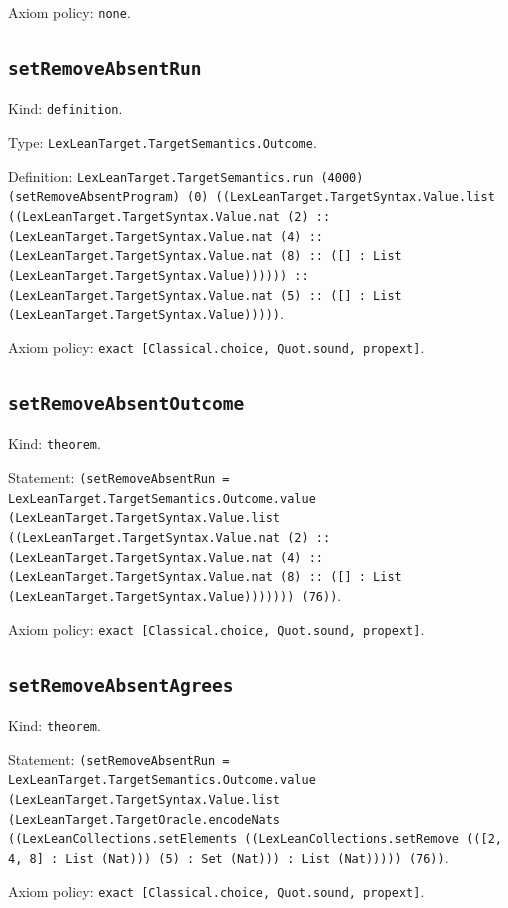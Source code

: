 \documentclass[11pt]{article}
\begin{document}
\noindent Axiom policy: \texttt{none}.\par
\subsection*{\texttt{setRemoveAbsentRun}}
\noindent Kind: \texttt{definition}.\par
\noindent Type: \texttt{LexLeanTarget.TargetSemantics.Outcome}.\par
\noindent Definition: \texttt{LexLeanTarget.TargetSemantics.run (4000) (setRemoveAbsentProgram) (0) ((LexLeanTarget.TargetSyntax.Value.list ((LexLeanTarget.TargetSyntax.Value.nat (2) :: (LexLeanTarget.TargetSyntax.Value.nat (4) :: (LexLeanTarget.TargetSyntax.Value.nat (8) :: ([] : List (LexLeanTarget.TargetSyntax.Value)))))) :: (LexLeanTarget.TargetSyntax.Value.nat (5) :: ([] : List (LexLeanTarget.TargetSyntax.Value)))))}.\par
\noindent Axiom policy: \texttt{exact [Classical.choice, Quot.sound, propext]}.\par
\subsection*{\texttt{setRemoveAbsentOutcome}}
\noindent Kind: \texttt{theorem}.\par
\noindent Statement: \texttt{(setRemoveAbsentRun = LexLeanTarget.TargetSemantics.Outcome.value (LexLeanTarget.TargetSyntax.Value.list ((LexLeanTarget.TargetSyntax.Value.nat (2) :: (LexLeanTarget.TargetSyntax.Value.nat (4) :: (LexLeanTarget.TargetSyntax.Value.nat (8) :: ([] : List (LexLeanTarget.TargetSyntax.Value))))))) (76))}.\par
\noindent Axiom policy: \texttt{exact [Classical.choice, Quot.sound, propext]}.\par
\subsection*{\texttt{setRemoveAbsentAgrees}}
\noindent Kind: \texttt{theorem}.\par
\noindent Statement: \texttt{(setRemoveAbsentRun = LexLeanTarget.TargetSemantics.Outcome.value (LexLeanTarget.TargetSyntax.Value.list (LexLeanTarget.TargetOracle.encodeNats ((LexLeanCollections.setElements ((LexLeanCollections.setRemove (([2, 4, 8] : List (Nat))) (5) : Set (Nat))) : List (Nat))))) (76))}.\par
\noindent Axiom policy: \texttt{exact [Classical.choice, Quot.sound, propext]}.\par
\end{document}
